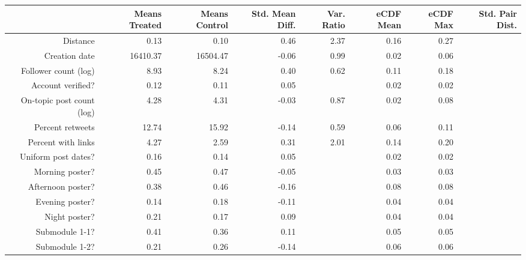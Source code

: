\begin{table}[ht]
\centering
\begin{tabular}{rrrrrrrr}
  & Means Treated & Means Control & Std. Mean Diff. & Var. Ratio & eCDF Mean & eCDF Max & Std. Pair Dist. \\ 
  \hline
Distance & 0.13 & 0.10 & 0.46 & 2.37 & 0.16 & 0.27 &  \\ 
   \hline
Creation date & 16410.37 & 16504.47 & -0.06 & 0.99 & 0.02 & 0.06 &  \\ 
   \hline
Follower count (log) & 8.93 & 8.24 & 0.40 & 0.62 & 0.11 & 0.18 &  \\ 
   \hline
Account verified? & 0.12 & 0.11 & 0.05 &  & 0.02 & 0.02 &  \\ 
   \hline
On-topic post count (log) & 4.28 & 4.31 & -0.03 & 0.87 & 0.02 & 0.08 &  \\ 
   \hline
Percent retweets & 12.74 & 15.92 & -0.14 & 0.59 & 0.06 & 0.11 &  \\ 
   \hline
Percent with links & 4.27 & 2.59 & 0.31 & 2.01 & 0.14 & 0.20 &  \\ 
   \hline
Uniform post dates? & 0.16 & 0.14 & 0.05 &  & 0.02 & 0.02 &  \\ 
   \hline
Morning poster? & 0.45 & 0.47 & -0.05 &  & 0.03 & 0.03 &  \\ 
   \hline
Afternoon poster? & 0.38 & 0.46 & -0.16 &  & 0.08 & 0.08 &  \\ 
   \hline
Evening poster? & 0.14 & 0.18 & -0.11 &  & 0.04 & 0.04 &  \\ 
   \hline
Night poster? & 0.21 & 0.17 & 0.09 &  & 0.04 & 0.04 &  \\ 
   \hline
Submodule 1-1? & 0.41 & 0.36 & 0.11 &  & 0.05 & 0.05 &  \\ 
   \hline
Submodule 1-2? & 0.21 & 0.26 & -0.14 &  & 0.06 & 0.06 &  \\ 
   \hline
\end{tabular}
\end{table}
